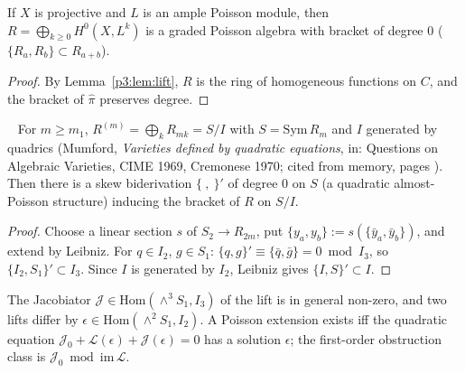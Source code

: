 \begin{prop}\tP\label{p3:prop:graded}
If $X$ is projective and $L$ is an ample Poisson module, then $R=\bigoplus_{k\ge0}H^0(X,L^k)$ is a graded Poisson algebra with bracket of degree $0$ ($\{R_a,R_b\}\subset R_{a+b}$).
\end{prop}
\begin{proof}
By Lemma~\ref{p3:lem:lift}, $R$ is the ring of homogeneous functions on $C$, and the bracket of $\hat\pi$ preserves degree.\qedhere
\end{proof}
\begin{prop}\tP\ \tC\label{p3:prop:almost}
For $m\ge m_1$, $R^{(m)}=\bigoplus_kR_{mk}=S/I$ with $S=\mathrm{Sym}\,R_m$ and $I$ generated by quadrics (Mumford, \emph{Varieties defined by quadratic equations}, in: Questions on Algebraic Varieties, CIME 1969, Cremonese 1970; cited from memory, pages \tQ). Then there is a skew biderivation $\{\ ,\ \}'$ of degree $0$ on $S$ (a quadratic almost-Poisson structure) inducing the bracket of $R$ on $S/I$.
\end{prop}
\begin{proof}
Choose a linear section $s$ of $S_2\to R_{2m}$, put $\{y_a,y_b\}:=s(\{\bar y_a,\bar y_b\})$, and extend by Leibniz. For $q\in I_2$, $g\in S_1$: $\{q,g\}'\equiv\{\bar q,\bar g\}=0\bmod I_3$, so $\{I_2,S_1\}'\subset I_3$. Since $I$ is generated by $I_2$, Leibniz gives $\{I,S\}'\subset I$.\qedhere
\end{proof}
\noindent The Jacobiator $\mathcal J\in\mathrm{Hom}(\wedge^3S_1,I_3)$ of the lift is in general non-zero, and two lifts differ by $\epsilon\in\mathrm{Hom}(\wedge^2S_1,I_2)$. A Poisson extension exists iff the quadratic equation $\mathcal J_0+\mathcal L(\epsilon)+\mathcal J(\epsilon)=0$ has a solution $\epsilon$; the first-order obstruction class is $\mathcal J_0\bmod\mathrm{im}\,\mathcal L$.

